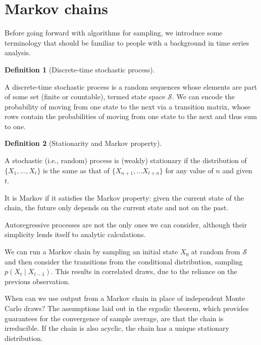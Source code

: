 \documentclass[
  11pt,
  letterpaper,
]{scrbook}
\theoremstyle{definition}
\newtheorem{definition}{Definition}[chapter]
\theoremstyle{plain}
\theoremstyle{plain}
\theoremstyle{definition}
\theoremstyle{definition}
\theoremstyle{remark}
\begin{document}
\section{Markov chains}\label{markov-chains}

Before going forward with algorithms for sampling, we introduce some
terminology that should be familiar to people with a background in time
series analysis.

\begin{definition}[Discrete-time stochastic
process]\protect\hypertarget{def-stoch-proc}{}\label{def-stoch-proc}

A discrete-time stochastic process is a random sequences whose elements
are part of some set (finite or countable), termed state space
\(\mathcal{S}.\) We can encode the probability of moving from one state
to the next via a transition matrix, whose rows contain the
probabilities of moving from one state to the next and thus sum to one.

\end{definition}

\begin{definition}[Stationarity and Markov
property]\protect\hypertarget{def-weak-stationarity}{}\label{def-weak-stationarity}

A stochastic (i.e., random) process is (weakly) stationary if the
distribution of \(\{X_1, \ldots, X_t\}\) is the same as that of
\(\{X_{n+1}, \ldots X_{t+n}\}\) for any value of \(n\) and given \(t.\)

It is Markov if it satisfies the Markov property: given the current
state of the chain, the future only depends on the current state and not
on the past.

\end{definition}

Autoregressive processes are not the only ones we can consider, although
their simplicity lends itself to analytic calculations.

We can run a Markov chain by sampling an initial state \(X_0\) at random
from \(\mathcal{S}\) and then consider the transitions from the
conditional distribution, sampling \(p(X_t \mid X_{t-1}).\) This results
in correlated draws, due to the reliance on the previous observation.

When can we use output from a Markov chain in place of independent Monte
Carlo draws? The assumptions laid out in the ergodic theorem, which
provides guarantees for the convergence of sample average, are that the
chain is irreducible. If the chain is also acyclic, the chain has a
unique stationary distribution.
\end{document}
